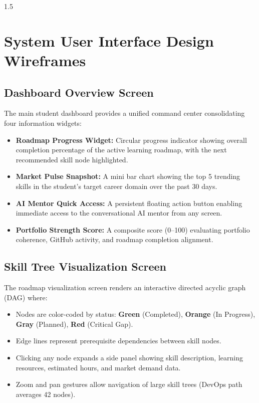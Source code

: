 \documentclass[12pt,a4paper]{report}
\begin{document}
\begin{spacing}{1.5}
		\section{System User Interface Design Wireframes}
		
		\subsection{Dashboard Overview Screen}
		
		The main student dashboard provides a unified command center consolidating four information widgets:
		
		\begin{itemize}
			\item \textbf{Roadmap Progress Widget:} Circular progress indicator showing overall completion percentage of the active learning roadmap, with the next recommended skill node highlighted.
			\item \textbf{Market Pulse Snapshot:} A mini bar chart showing the top 5 trending skills in the student's target career domain over the past 30 days.
			\item \textbf{AI Mentor Quick Access:} A persistent floating action button enabling immediate access to the conversational AI mentor from any screen.
			\item \textbf{Portfolio Strength Score:} A composite score (0--100) evaluating portfolio coherence, GitHub activity, and roadmap completion alignment.
		\end{itemize}
		
		\subsection{Skill Tree Visualization Screen}
		
		The roadmap visualization screen renders an interactive directed acyclic graph (DAG) where:
		
		\begin{itemize}
			\item Nodes are color-coded by status: \textbf{\color{accentgreen}Green} (Completed), \textbf{\color{accentorange}Orange} (In Progress), \textbf{Gray} (Planned), \textbf{\color{red}Red} (Critical Gap).
			\item Edge lines represent prerequisite dependencies between skill nodes.
			\item Clicking any node expands a side panel showing skill description, learning resources, estimated hours, and market demand data.
			\item Zoom and pan gestures allow navigation of large skill trees (DevOps path averages 42 nodes).
		\end{itemize}
		

\end{spacing}
\end{document}
